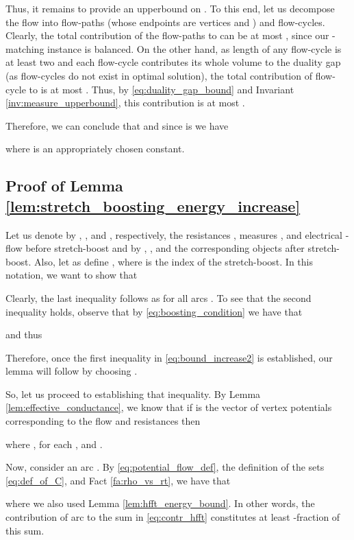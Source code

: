 \documentclass[11pt, letterpaper]{article}
\begin{document}
Thus, it remains to provide an upperbound on . To this end, let us decompose the flow  into flow-paths (whose endpoints are vertices  and ) and flow-cycles. Clearly, the total contribution of the flow-paths to  can be at most , since our -matching instance is balanced. On the other hand, as length of any flow-cycle is at least two and each flow-cycle contributes its whole volume to the duality gap  (as flow-cycles do not exist in optimal solution), the total contribution of flow-cycle to  is at most . Thus, by \eqref{eq:duality_gap_bound} and Invariant \ref{inv:measure_upperbound}, this contribution is at most . 

Therefore, we can conclude that  and since  is  we have

where  is an appropriately chosen constant.

\subsection{Proof of Lemma \ref{lem:stretch_boosting_energy_increase}}\label{app:stretch_boosting_energy_increase}

Let us denote by , , and , respectively, the resistances , measures , and electrical -flow  before stretch-boost and by , , and  the corresponding objects after stretch-boost. Also, let as define , where  is the index of the stretch-boost. In this notation, we want to show that  

Clearly, the last inequality follows as  for all arcs . To see that the second inequality holds, observe that by \eqref{eq:boosting_condition} we have that

and thus

 Therefore, once the first inequality in \eqref{eq:bound_increase2} is established, our lemma will follow by choosing .


So, let us proceed to establishing that inequality. By Lemma \ref{lem:effective_conductance}, we know that if  is the vector of vertex potentials corresponding to the flow  and resistances  then 

where , for each , and . 

Now, consider an arc . By \eqref{eq:potential_flow_def}, the definition of the sets  \eqref{eq:def_of_C}, and Fact \ref{fa:rho_vs_rt}, we have that

where we also used Lemma \ref{lem:hfft_energy_bound}. In other words, the contribution of arc  to the sum in \eqref{eq:contr_hfft} constitutes at least -fraction of this sum.
\end{document}
